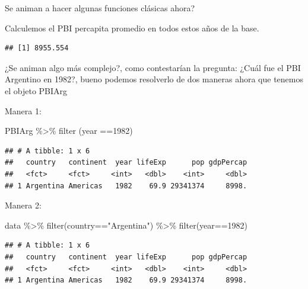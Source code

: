 \documentclass[
]{book}
\newenvironment{Shaded}{\begin{snugshade}}{\end{snugshade}}
\newcommand{\DecValTok}[1]{\textcolor[rgb]{0.00,0.00,0.81}{#1}}
\newcommand{\FunctionTok}[1]{\textcolor[rgb]{0.00,0.00,0.00}{#1}}
\newcommand{\NormalTok}[1]{#1}
\newcommand{\SpecialCharTok}[1]{\textcolor[rgb]{0.00,0.00,0.00}{#1}}
\newcommand{\StringTok}[1]{\textcolor[rgb]{0.31,0.60,0.02}{#1}}
\begin{document}
Se animan a hacer algunas funciones clásicas ahora?

Calculemos el PBI percapita promedio en todos estos años de la base.

\begin{Shaded}
\end{Shaded}

\begin{verbatim}
## [1] 8955.554
\end{verbatim}

¿Se animan algo más complejo?, como contestarían la pregunta: ¿Cuál fue el PBI Argentino en 1982?, bueno podemos resolverlo de dos maneras ahora que tenemos el objeto PBIArg

Manera 1:

\begin{Shaded}
\begin{Highlighting}[]
\NormalTok{PBIArg }\SpecialCharTok{\%\textgreater{}\%} \FunctionTok{filter}\NormalTok{ (year }\SpecialCharTok{==}\DecValTok{1982}\NormalTok{)}
\end{Highlighting}
\end{Shaded}

\begin{verbatim}
## # A tibble: 1 x 6
##   country   continent  year lifeExp      pop gdpPercap
##   <fct>     <fct>     <int>   <dbl>    <int>     <dbl>
## 1 Argentina Americas   1982    69.9 29341374     8998.
\end{verbatim}

Manera 2:

\begin{Shaded}
\begin{Highlighting}[]
\NormalTok{data }\SpecialCharTok{\%\textgreater{}\%} \FunctionTok{filter}\NormalTok{(country}\SpecialCharTok{==}\StringTok{"Argentina"}\NormalTok{) }\SpecialCharTok{\%\textgreater{}\%} \FunctionTok{filter}\NormalTok{(year}\SpecialCharTok{==}\DecValTok{1982}\NormalTok{)}
\end{Highlighting}
\end{Shaded}

\begin{verbatim}
## # A tibble: 1 x 6
##   country   continent  year lifeExp      pop gdpPercap
##   <fct>     <fct>     <int>   <dbl>    <int>     <dbl>
## 1 Argentina Americas   1982    69.9 29341374     8998.
\end{verbatim}
\end{document}
